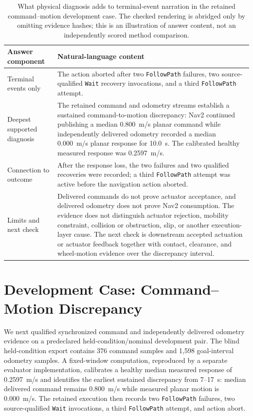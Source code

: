 \documentclass[conference]{IEEEtran}
\begin{document}
\begin{table}[t]
\caption{What physical diagnosis adds to terminal-event narration in the retained command--motion
development case. The checked rendering is abridged only by omitting evidence hashes; this is an
illustration of answer content, not an independently scored method comparison.}
\label{tab:answer-example}
\centering
\small
\begin{tabular}{@{}p{}p{}@{}}
\toprule
Answer component & Natural-language content \\
\midrule
Terminal events only &
The action aborted after two \texttt{FollowPath} failures, two source-qualified \texttt{Wait}
recovery invocations, and a third \texttt{FollowPath} attempt. \\
\addlinespace
Deepest supported diagnosis &
The retained command and odometry streams establish a sustained command-to-motion discrepancy:
Nav2 continued publishing a median 0.800~m/s planar command while independently delivered odometry
recorded a median 0.000~m/s planar response for 10.0~s. The calibrated healthy measured response
was 0.2597~m/s. \\
\addlinespace
Connection to outcome &
After the response loss, the two failures and two qualified recoveries were recorded; a third
\texttt{FollowPath} attempt was active before the navigation action aborted. \\
\addlinespace
Limits and next check &
Delivered commands do not prove actuator acceptance, and delivered odometry does not prove Nav2
consumption. The evidence does not distinguish actuator rejection, mobility constraint, collision
or obstruction, slip, or another execution-layer cause. The next check is downstream accepted
actuation or actuator feedback together with contact, clearance, and wheel-motion evidence over
the discrepancy interval. \\
\bottomrule
\end{tabular}
\end{table}

\section{Development Case: Command--Motion Discrepancy}

We next qualified synchronized command and independently delivered odometry evidence on a
predeclared held-condition/nominal development pair. The blind held-condition export contains 376
command samples and 1,598 goal-interval odometry samples. A fixed-window computation, reproduced
by a separate evaluator implementation, calibrates a healthy median measured response of
0.2597~m/s and identifies the earliest sustained discrepancy from 7--17~s: median delivered
command remains 0.800~m/s while measured planar motion is 0.000~m/s. The retained execution then
records two \texttt{FollowPath} failures, two source-qualified \texttt{Wait} invocations, a third
\texttt{FollowPath} attempt, and action abort.
\end{document}
